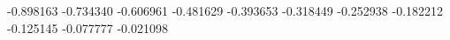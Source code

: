-0.898163
-0.734340
-0.606961
-0.481629
-0.393653
-0.318449
-0.252938
-0.182212
-0.125145
-0.077777
-0.021098

